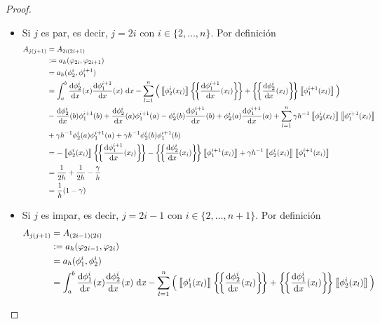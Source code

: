 \documentclass[10pt,a4paper]{report}
\newcommand{\dx}{\textup{d}x}
\providecommand{\Dx}[1]{\frac{\textup{d} #1}{\textup{d}x}}
\providecommand{\salto}[1]{\left\llbracket#1\right\rrbracket}
\providecommand{\prom}[1]{\left \{\!\left \{#1\right \}\!\right \}}
\begin{document}
\begin{proof}
\begin{itemize}
\begin{itemize}
\begin{align*}
                	&= -\frac{1}{h} + \frac{1}{2h} + \frac{1}{h}\\
                	&= \frac{1}{2h}
                \end{align*}
                \newpage
            	\item Si $j$ es par, es decir, $j = 2i$ con $i\in\{2,\dots,n\}$. Por definición
            	\begin{align*}
            		A_{j(j+1)} &= A_{2i (2i+1)}\\ 
            		           &:= a_{h}(\varphi_{2i},\varphi_{2i+1})\\ 
            		           &= a_{h}(\phi^{i}_{2},\phi^{i+1}_{1})\\
            		           &=  \int_{a}^{b} \Dx{\phi^{i}_{2}}(x)\Dx{\phi^{i+1}_{1}}(x)\ \dx - \sum_{l=1}^{n}\Big(\salto{\phi^{i}_{2}(x_{l})}\prom{\Dx{\phi^{i+1}_{1}}(x_{l})} + \prom{\Dx{\phi^{i}_{2}}(x_{l})}\salto{\phi^{i+1}_{1}(x_{l})}\Big)\\
            		           &-\Dx{\phi^{i}_{2}}(b)\phi^{i+1}_{1}(b) + \Dx{\phi^{i}_{2}}(a)\phi^{i+1}_{1}(a) - \phi^{i}_{2}(b)\Dx{\phi^{i+1}_{1}}(b) + \phi^{i}_{2}(a)\Dx{\phi^{i+1}_{1}}(a) + \sum_{l=1}^{n}\gamma h^{-1}\salto{\phi^{i}_{2}(x_{l})}\salto{\phi^{i+1}_{1}(x_{l})}\\
            		           &+ \gamma h^{-1}\phi^{i}_{2}(a)\phi^{i+1}_{1}(a) + \gamma h^{-1}\phi^{i}_{2}(b)\phi^{i+1}_{1}(b)\\
            		           &= -\salto{\phi^{i}_{2}(x_{i})}\prom{\Dx{\phi^{i+1}_{1}}(x_{l})} - \prom{\Dx{\phi^{i}_{2}}(x_{i})}\salto{\phi^{i+1}_{1}(x_{i})} + \gamma h^{-1}\salto{\phi^{i}_{2}(x_{i})}\salto{\phi^{i+1}_{1}(x_{i})}\\
            		           &= \frac{1}{2h} + \frac{1}{2h}-\frac{\gamma}{h}\\
            		           &= \frac{1}{h}(1-\gamma)
            	\end{align*}
            	\item Si $j$ es impar, es decir, $j = 2i-1$ con $i\in\{2,\dots,n+1\}$. Por definición
            	\begin{align*}
            		A_{j(j+1)} &= A_{(2i-1) (2i)}\\ 
            		           &:= a_{h}(\varphi_{2i-1},\varphi_{2i})\\
            		           &= a_{h}(\phi^{i}_{1},\phi^{i}_{2})\\
            		           &= \int_{a}^{b} \Dx{\phi^{i}_{1}}(x)\Dx{\phi^{i}_{2}}(x)\ \dx - \sum_{l=1}^{n}\Big(\salto{\phi^{i}_{1}(x_{l})}\prom{\Dx{\phi^{i}_{2}}(x_{l})} + \prom{\Dx{\phi^{i}_{1}}(x_{l})}\salto{\phi^{i}_{2}(x_{l})}\Big)\\

\end{align*}
\end{itemize}
\end{itemize}
\end{proof}
\end{document}
